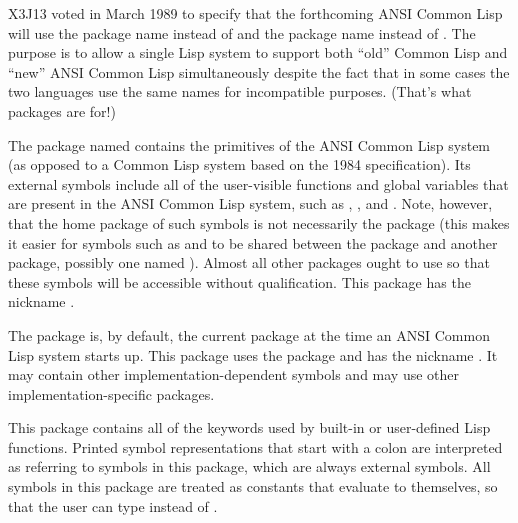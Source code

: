 \begin{newer}
X3J13 voted in March 1989  to specify that
the forthcoming ANSI Common Lisp will use the package name 
instead of  and the package name 
instead of .  The purpose is to allow a single Lisp system
to support both ``old'' Common Lisp and ``new'' ANSI Common Lisp
simultaneously despite the fact that in some cases
the two languages use the same
names for incompatible purposes.  (That's what packages are for!)

\begin{flushdesc}
\item[\cd{common-lisp}]
The package named  contains the primitives of the
ANSI Common Lisp system (as opposed to a Common Lisp system based
on the 1984 specification).  Its external symbols include all of the
user-visible functions and global variables that are present in the
ANSI Common Lisp system, such as , , and .
Note, however, that the home package of such symbols is not
necessarily the  package (this makes it easier for
symbols such as  and  to be shared between
the  package and another package, possibly one named ).
Almost all other packages ought to use  so that these
symbols will be accessible without qualification.
This package has the nickname .

\item[\cd{common-lisp-user}]
The  package is, by default,
the current package at the time an ANSI Common Lisp system starts up.
This package uses the  package
and has the nickname .
It may contain other implementation-dependent symbols
and may use other implementation-specific packages.
\end{flushdesc}
\end{newer}

\begin{flushdesc}
\item[\cd{keyword}]
This package contains all of the keywords used by built-in
or user-defined Lisp functions.  Printed symbol representations
that start with a colon are interpreted as referring to symbols
in this package, which are always external symbols.  All symbols in this
package are treated as constants that evaluate to themselves, so that the
user can type  instead of .
\end{flushdesc}

